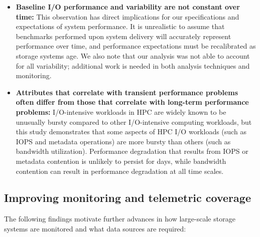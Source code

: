 \begin{itemize}[leftmargin=*]

\item \textbf{Baseline I/O performance and variability are not constant over
time:}
This observation has direct implications for our specifications and expectations of system performance.
It is unrealistic to assume that benchmarks performed upon system delivery
will accurately represent performance over time, and performance
expectations must be recalibrated as storage systems age.  We also note that
our analysis was not able to account for all variability; additional work is
needed in both analysis techniques and monitoring.

\item \textbf{Attributes that correlate with transient performance problems often differ from those that correlate with long-term performance problems:}
I/O-intensive workloads in HPC are widely known to be unusually bursty compared to other I/O-intensive computing workloads, but this study demonstrates that some aspects of HPC I/O workloads (such as IOPS and metadata operations) are more bursty than others (such as bandwidth utilization).
Performance degradation that results from IOPS or metadata contention is unlikely to persist for days, while bandwidth contention can result in performance degradation at all time scales.

\end{itemize}


\subsection{Improving monitoring and telemetric coverage}

The following findings motivate further advances in how large-scale storage systems are monitored and what data sources are required:


